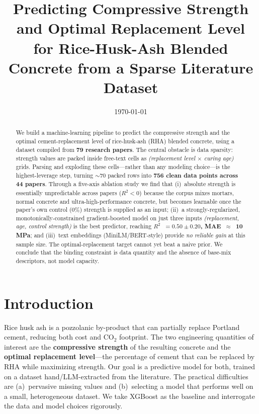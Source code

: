 \documentclass[11pt]{article}
\title{\textbf{Predicting Compressive Strength and Optimal Replacement Level\\
for Rice-Husk-Ash Blended Concrete from a Sparse Literature Dataset}}
\date{\today}
\newcommand{\R}{$R^2$}
\begin{document}
\maketitle

\begin{abstract}
\noindent
We build a machine-learning pipeline to predict the compressive strength and the
optimal cement-replacement level of rice-husk-ash (RHA) blended concrete, using a
dataset compiled from \textbf{79 research papers}. The central obstacle is data
sparsity: strength values are packed inside free-text cells as
\emph{(replacement level $\times$ curing age)} grids. Parsing and exploding these
cells---rather than any modeling choice---is the highest-leverage step, turning
$\sim$70 packed rows into \textbf{756 clean data
points across 44 papers}. Through a five-axis ablation study we find that
(i)~absolute strength is essentially unpredictable across papers ($R^2<0$) because
the corpus mixes mortars, normal concrete and ultra-high-performance concrete, but
becomes learnable once the paper's own control (0\%) strength is supplied as an
input; (ii)~a strongly-regularized, monotonically-constrained gradient-boosted
model on just three inputs \emph{(replacement, age, control strength)} is the best
predictor, reaching \textbf{\R{}~$=0.50\pm0.20$, MAE~$\approx$~10\,MPa}; and
(iii)~text embeddings (MiniLM/BERT-style) provide \emph{no reliable gain} at this
sample size. The optimal-replacement target cannot yet beat a naive prior. We
conclude that the binding constraint is data quantity and the absence of base-mix
descriptors, not model capacity.
\end{abstract}

\section{Introduction}
Rice husk ash is a pozzolanic by-product that can partially replace Portland cement,
reducing both cost and $\mathrm{CO_2}$ footprint. The two engineering quantities of
interest are the \textbf{compressive strength} of the resulting concrete and the
\textbf{optimal replacement level}---the percentage of cement that can be replaced by
RHA while maximizing strength. Our goal is a predictive model for both, trained on a
dataset hand/LLM-extracted from the literature. The practical difficulties are
(a)~pervasive missing values and (b)~selecting a model that performs well on a small,
heterogeneous dataset. We take XGBoost as the baseline and interrogate the data and
model choices rigorously.
\end{document}
